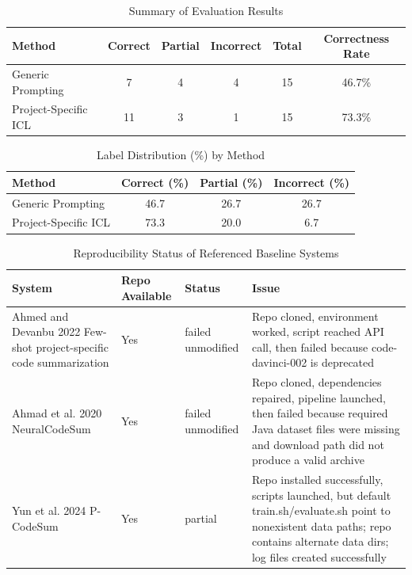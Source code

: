 \begin{table}[ht]
\centering
\caption{Summary of Evaluation Results}
\label{tab:result-summary}
\begin{tabular}{lccccc}
\toprule
Method & Correct & Partial & Incorrect & Total & Correctness Rate \\
\midrule
Generic Prompting & 7 & 4 & 4 & 15 & 46.7\% \\
Project-Specific ICL & 11 & 3 & 1 & 15 & 73.3\% \\
\bottomrule
\end{tabular}
\end{table}



\begin{table}[ht]
\centering
\caption{Label Distribution (\%) by Method}
\label{tab:label-percentages}
\begin{tabular}{lccc}
\toprule
Method & Correct (\%) & Partial (\%) & Incorrect (\%) \\
\midrule
Generic Prompting & 46.7 & 26.7 & 26.7 \\
Project-Specific ICL & 73.3 & 20.0 & 6.7 \\
\bottomrule
\end{tabular}
\end{table}



\begin{table}[ht]
\centering
\caption{Reproducibility Status of Referenced Baseline Systems}
\label{tab:baseline-status}
\begin{tabular}{llll}
\toprule
System & Repo Available & Status & Issue \\
\midrule
Ahmed and Devanbu 2022 Few-shot project-specific code summarization & Yes & failed unmodified & Repo cloned, environment worked, script reached API call, then failed because code-davinci-002 is deprecated \\
Ahmad et al. 2020 NeuralCodeSum & Yes & failed unmodified & Repo cloned, dependencies repaired, pipeline launched, then failed because required Java dataset files were missing and download path did not produce a valid archive \\
Yun et al. 2024 P-CodeSum & Yes & partial & Repo installed successfully, scripts launched, but default train.sh/evaluate.sh point to nonexistent data paths; repo contains alternate data dirs; log files created successfully \\
\bottomrule
\end{tabular}
\end{table}



